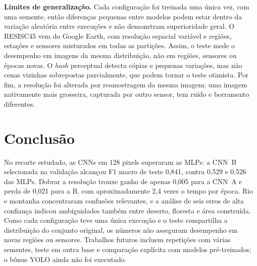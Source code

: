 \documentclass[12pt,a4paper]{article}
\begin{document}
\textbf{Limites de generalização.} Cada configuração foi treinada uma única vez, com uma semente, então diferenças pequenas entre modelos podem estar dentro da variação aleatória entre execuções e não demonstram superioridade geral. O RESISC45 vem do Google Earth, com resolução espacial variável e regiões, estações e sensores misturados em todas as partições. Assim, o teste mede o desempenho em imagens da mesma distribuição, não em regiões, sensores ou épocas novas. O \textit{hash} perceptual detecta cópias e pequenas variações, mas não cenas vizinhas sobrepostas parcialmente, que podem tornar o teste otimista. Por fim, a resolução foi alterada por reamostragem da mesma imagem; uma imagem nativamente mais grosseira, capturada por outro sensor, tem ruído e borramento diferentes.

\section{Conclusão}

No recorte estudado, as CNNs em 128 pixels superaram as MLPs: a CNN~B selecionada na validação alcançou F1 macro de teste 0,841, contra 0,529 e 0,526 das MLPs. Dobrar a resolução trouxe ganho de apenas 0,005 para a CNN~A e perda de 0,021 para a B, com aproximadamente 2,4 vezes o tempo por época. Rio e montanha concentraram confusões relevantes, e a análise de seis erros de alta confiança indicou ambiguidades também entre deserto, floresta e área construída. Como cada configuração teve uma única execução e o teste compartilha a distribuição do conjunto original, os números não asseguram desempenho em novas regiões ou sensores. Trabalhos futuros incluem repetições com várias sementes, teste em outra base e comparação explícita com modelos pré-treinados; o bônus YOLO ainda não foi executado.
\end{document}
